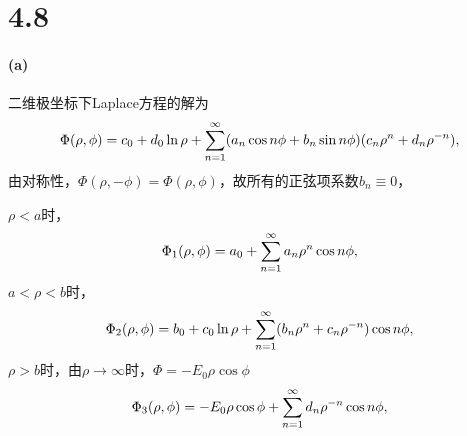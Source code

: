 \def\coursename{电动力学习题}
\def\beginday{2023/3/25}




\newcommand{\er}{\varepsilon_\text r}


\setcounter{section}{1}
\section*{4.8}
\paragraph{(a)}
二维极坐标下Laplace方程的解为
\begin{equation}
    \Phi(\rho,\phi)=c_0+d_0\ln\rho+\sum_{n=1}^{\infty}(a_n\cos n\phi+b_n\sin n\phi)(c_n\rho^n+d_n\rho^{-n}),
\end{equation}
由对称性，$\Phi(\rho,-\phi)=\Phi(\rho,\phi)$，故所有的正弦项系数$b_n\equiv 0$，

$\rho<a$时， 
\begin{equation}
    \Phi_1(\rho,\phi)=a_0+\sum_{n=1}^{\infty}a_n\rho^n\cos n\phi,
\end{equation}
$a<\rho<b$时， 
\begin{equation}
    \Phi_2(\rho,\phi)=b_0+c_0\ln\rho+\sum_{n=1}^{\infty}(b_n\rho^n+c_n\rho^{-n})\cos n\phi,
\end{equation}
$\rho>b$时，由$\rho\to\infty$时，$\Phi=-E_0\rho\cos\phi$
\begin{equation}
    \Phi_3(\rho,\phi)=-E_0\rho\cos\phi+\sum_{n=1}^{\infty}d_n\rho^{-n}\cos n\phi,
\end{equation}

